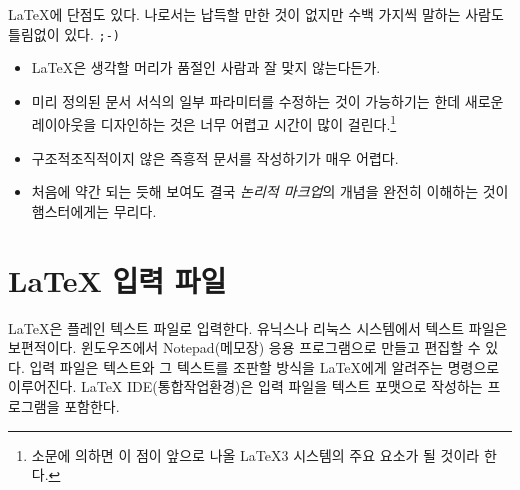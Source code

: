 \medskip

\noindent \LaTeX 에 단점도 있다. 나로서는 납득할 만한 것이 없지만 수백 가지씩 말하는 사람도 틀림없이 있다. \texttt{;-)}

\begin{itemize} \oblivoirlist
\item \LaTeX 은 생각할 머리가 품절인 사람과 잘 맞지 않는다든가\hdots\hdots.
\item 미리 정의된 문서 서식의 일부 파라미터를 수정하는 것이 가능하기는 한데 새로운 레이아웃을 디자인하는 것은 너무 어렵고 시간이 많이 걸린다.\footnote{%
  소문에 의하면 이 점이 앞으로 나올 \LaTeX 3 시스템의 주요 요소가 될 것이라 한다.
}
\item 구조적\cntrdot 조직적이지 않은 즉흥적 문서를 작성하기가 매우 어렵다.
\item 처음에 약간 되는 듯해 보여도 결국 \emph{논리적 마크업}의 개념을 완전히 이해하는 것이 햄스터에게는 무리다.
\end{itemize}

\section{\LaTeX{} 입력 파일}

\LaTeX 은 플레인 텍스트 파일로 입력한다. 유닉스나 리눅스 시스템에서 텍스트 파일은 보편적이다. 윈도우즈에서 
Notepad(메모장) 응용 프로그램으로 만들고 편집할 수 있다.
입력 파일은 텍스트와 그 텍스트를 조판할 방식을 \LaTeX 에게 알려주는 명령으로 이루어진다. 
\LaTeX{} IDE(통합작업환경)은 입력 파일을 텍스트 포맷으로 작성하는 프로그램을 포함한다.

